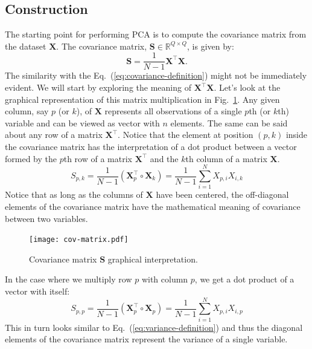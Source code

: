 \documentclass[10pt,twocolumn]{article}
\begin{document}
\subsection{Construction}

The starting point for performing PCA is to compute the covariance matrix from the dataset $\mathbf{X}$. The covariance matrix, $\mathbf{S} \in \mathbb{R}^{Q \times Q}$, is given by:
\begin{equation}\label{eq:cov-matrix}
\mathbf{S} = \frac{1}{N-1} \mathbf{X}^{\top} \mathbf{X}.
\end{equation}
The similarity with the Eq.~(\ref{eq:covariance-definition}) might not be immediately evident. We will start by exploring the meaning of $\mathbf{X}^{\top} \mathbf{X}$. Let's look at the graphical representation of this matrix multiplication in Fig.~\ref{fig:covariance-matrix}. Any given column, say $p$ (or $k$), of $\mathbf{X}$ represents all observations of a single $p$th (or $k$th) variable and can be viewed as vector with $n$ elements. The same can be said about any row of a matrix $\mathbf{X}^{\top}$. Notice that the element at position $(p,k)$ inside the covariance matrix has the interpretation of a dot product between a vector formed by the $p$th row of a matrix $\mathbf{X}^{\top}$ and the $k$th column of a matrix $\mathbf{X}$.
\begin{equation}
S_{p,k} = \frac{1}{N-1} (\mathbf{X}_p^{\top} \circ \mathbf{X}_k) = \frac{1}{N-1} \sum_{i=1}^N X_{p, i} X_{i, k}
\end{equation}
Notice that as long as the columns of $\mathbf{X}$ have been centered, the off-diagonal elements of the covariance matrix have the mathematical meaning of covariance between two variables.
\begin{figure}[t]
\centering\texttt{[image: cov-matrix.pdf]}
\caption{Covariance matrix $\mathbf{S}$ graphical interpretation.}
\label{fig:covariance-matrix}
\end{figure}
In the case where we multiply row $p$ with column $p$, we get a dot product of a vector with itself:
\begin{equation}
S_{p,p} = \frac{1}{N-1} ( \mathbf{X}_p^{\top} \circ \mathbf{X}_p) = \frac{1}{N-1} \sum_{i=1}^N X_{p, i} X_{i, p}
\end{equation}
This in turn looks similar to Eq.~(\ref{eq:variance-definition}) and thus the diagonal elements of the covariance matrix represent the variance of a single variable.
\end{document}

